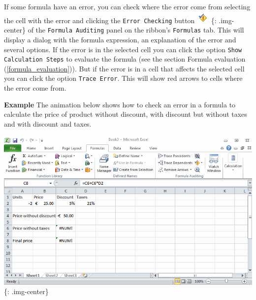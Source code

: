 If some formula have an error, you can check where the error come from selecting the cell with the error and clicking the \texttt{Error Checking} button \includegraphics[keepaspectratio,width=\textwidth,height=0.75\textheight]{img/button_error_checking.png}
\{: .img-center\} of the \texttt{Formula Auditing} panel on the ribbon's \texttt{Formulas} tab. This will display a dialog with the formula expression, an explanation of the error and several options. If the error is in the selected cell you can click the option \texttt{Show Calculation Steps} to evaluate the formula (see the section Formula evaluation (\autoref{formula_evaluation})). But if the error is in a cell that affects the selected cell you can click the option \texttt{Trace Error}. This will show red arrows to cells where the error come from.

\textbf{Example} The animation below shows how to check an error in a formula to calculate the price of product without discount, with discount but without taxes and with discount and taxes.

\includegraphics[keepaspectratio,width=\textwidth,height=0.75\textheight]{img/example_error_checking.gif}
\{: .img-center\}


